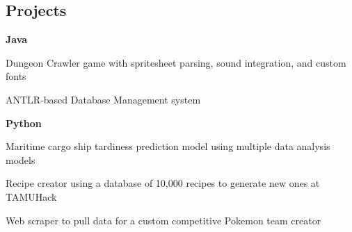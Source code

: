\documentclass[10pt,letterpaper]{article}
\newenvironment{indentsection}[1]%
{\begin{list}{}%
	{\setlength{\leftmargin}{#1}}%
	\item[]%
}
{\end{list}}
\begin{document}
	\subsection*{Projects}
	\begin{indentsection}{\parindent}
		\begin{itemize*}
		\item \textbf{Java} 
		\vspace{-0.2em}
			\begin{itemize*}
				\item Dungeon Crawler game with spritesheet parsing, sound integration, and custom fonts 
				\item ANTLR-based Database Management system
			\end{itemize*}
		\item \textbf{Python}
		\vspace{-0.2em}
			\begin{itemize*}
				\item Maritime cargo ship tardiness prediction model using multiple data analysis models
				\item Recipe creator using a database of 10,000 recipes to generate new ones at TAMUHack 
				\item Web scraper to pull data for a custom competitive Pokemon team creator
			\end{itemize*}
		\end{itemize*}
	\end{indentsection}
\end{document}
